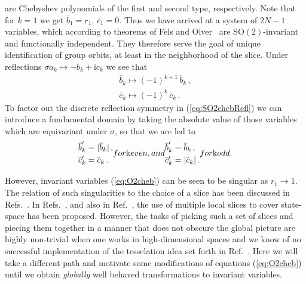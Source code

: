 \documentclass[aip,cha,showpacs,twocolumn, 
 		  reprint]{revtex4-1} %
\newcommand{\bseq}{\begin{subequations}}
\newcommand{\eseq}{\end{subequations}}
\newcommand{\rf}     [1] {~\cite{#1}}
\newcommand{\refref} [1] {Ref.~\cite{#1}}
\newcommand{\refrefs}[1] {Refs.~\cite{#1}}
\newcommand{\refeq}  [1] {(\ref{#1})}
\newcommand{\SOn}[1]{\ensuremath{\textrm{SO}(#1)}}         %
\newcommand{\Refl}{\ensuremath{\sigma}}
\newcommand{\ii}{\ensuremath{\mathrm{i}}} %
\begin{document}
are Chebyshev polynomials of the first and second type, respectively. 
Note that for $k=1$ we get $\overline{b}_1=r_1,\, \overline{c}_1=0$. 
Thus we have arrived at a system of $2N-1$ variables, which according to 
theorems of Fels and Olver\rf{FelsOlver98,FelsOlver99} are
$\SOn{2}$-invariant and functionally independent. They therefore serve the goal
of unique identification of group orbits, at least in the neighborhood of the
slice. Under reflections $\Refl a_k \mapsto-b_k+\ii c_k$ we see that
\bseq\label{eq:SO2chebRefl}
 \begin{align}
  \overline{b}_k \mapsto (-1)^{k+1}\, \overline{b}_k\,,\\ 
  \overline{c}_k \mapsto (-1)^{k}\, \overline{c}_k\,.
 \end{align}
\eseq
 To factor out the discrete reflection symmetry in \refeq{eq:SO2chebRefl} we can
introduce a fundamental domain by taking the absolute value of those variables
which are equivariant under $\Refl$, so that we are led to
\bseq\label{eq:O2cheb}
  \begin{align}
    \overline{b}'_k &= 
		    |\overline{b}_k|\,, \\
    \overline{c}'_k &=
		    \overline{c}_k\,.
  \end{align}
for $k$ even, and
  \begin{align}
    \overline{b}'_k &= 
		    \overline{b}_k\,, \\
    \overline{c}'_k &=
		    |\overline{c}_k|\,.
  \end{align}
for $k$ odd.
\eseq

However, invariant variables \refeq{eq:O2cheb} can be seen to be singular as 
$r_1\rightarrow1$. The relation of such singularities to the choice of a slice
has been discussed in \refrefs{SiminosThesis, SiCvi10, FrCv11}. In 
\refrefs{SiCvi10, FrCv11}, and also in \refref{rowley_reconstruction_2000},
the use of multiple local slices to cover state-space has been proposed.
However, the tasks of picking such a set of slices 
and piecing them together in a manner that does not obscure the global picture
are highly non-trivial when one works in high-dimensional spaces and we know
of no successful implementation of the tesselation idea set forth in 
\refref{FrCv11}. Here we will take a different path and motivate some 
modifications of equations \refeq{eq:O2cheb} until we obtain 
\emph{globally} well behaved transformations to invariant variables.
\end{document}
